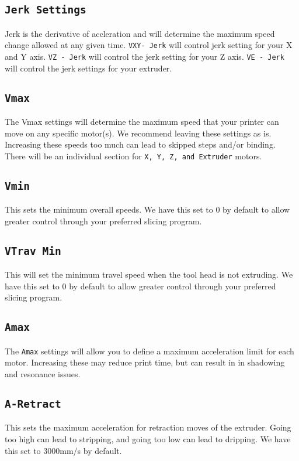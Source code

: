 \subsection{\texttt{Jerk Settings}}
Jerk is the derivative of accleration and will determine the maximum speed change allowed at any given time. \texttt{VXY- Jerk} will control jerk setting for your X and Y axis. \texttt{VZ - Jerk} will control the jerk setting for your Z axis. \texttt{VE - Jerk} will control the jerk settings for your extruder.

\subsection{\texttt{Vmax}}
The Vmax settings will determine the maximum speed that your printer can move on any specific motor(s). We recommend leaving these settings as is. Increasing these speeds too much can lead to skipped steps and/or binding. There will be an individual section for \texttt{X, Y, Z, and Extruder} motors. 

\subsection{\texttt{Vmin}}
This sets the minimum overall speeds. We have this set to 0 by default to allow greater control through your preferred slicing program. 

\subsection{\texttt{VTrav Min}}
This will set the minimum travel speed when the tool head is not extruding. We have this set to 0 by default to allow greater control through your preferred slicing program. 

\subsection{\texttt{Amax}}
The \texttt{Amax} settings will allow you to define a maximum acceleration limit for each motor. Increasing these may reduce print time, but can result in in shadowing and resonance issues.

\subsection{\texttt{A-Retract}} 
This sets the maximum acceleration for retraction moves of the extruder. Going too high can lead to stripping, and going too low can lead to dripping. We have this set to 3000mm/s\textsuperscript{} by default.

